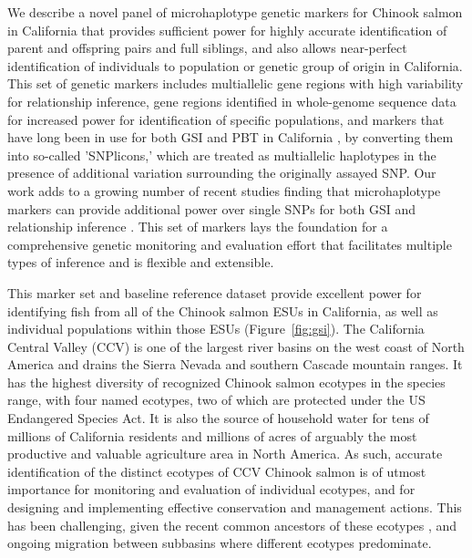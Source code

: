 We describe a novel panel of microhaplotype genetic markers for Chinook salmon
in California that provides sufficient power for highly accurate identification 
of parent and offspring pairs and full siblings, and also allows near-perfect
identification of individuals to population or genetic group of origin in California. 
This set of genetic markers includes multiallelic gene regions with high variability for
relationship inference, gene regions identified in whole-genome sequence data
for increased power for identification of specific populations, and markers that have
long been in use for both GSI and PBT in California \citep{clemento2014evaluation}, by converting them
into so-called 'SNPlicons,' which are treated as multiallelic haplotypes in the presence
of additional variation surrounding the originally assayed SNP\@. Our work adds to a growing
number of recent studies finding that microhaplotype markers can provide additional
power over single SNPs for both GSI \citep{mckinney2017managing,mckinney2022new,hargrove2024efficient} and
relationship inference \citep{baetscher2018microhaplotypes,bootsma2020gt,delomas2024microhaplotypes}.
This set of markers lays the foundation for a comprehensive 
genetic monitoring and evaluation effort that facilitates multiple types of inference 
and is flexible and extensible.


This marker set and baseline reference dataset provide
excellent power for identifying fish from all of the Chinook salmon ESUs in California,
as well as individual populations within those ESUs (Figure~\ref{fig:gsi}).
The California Central Valley (CCV) is one of the largest river
basins on the west coast of North America and drains the Sierra Nevada and southern Cascade
mountain ranges. It has the highest diversity of recognized Chinook salmon
ecotypes in the species range, with four named ecotypes, two of which are protected
under the US Endangered Species Act. It is also the source of household water for
tens of millions of California residents and millions of acres of arguably
the most productive and valuable agriculture area in North America. As such, accurate identification of the distinct 
ecotypes of CCV Chinook salmon is of utmost importance for monitoring and
evaluation of individual ecotypes, and for designing and implementing
effective conservation and management actions. This has been challenging,
given the recent common ancestors of these ecotypes \citep{clemento2014evaluation}, and
ongoing migration between subbasins where different ecotypes predominate.

